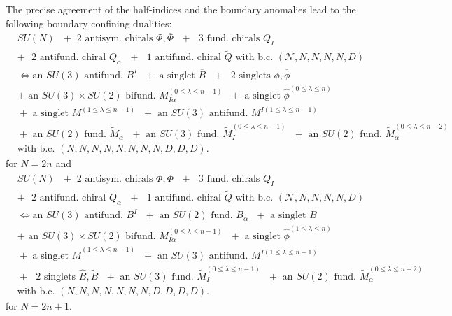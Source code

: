 \documentclass[12pt]{article}
\numberwithin{equation}{section}
\begin{document}
The precise agreement of the half-indices and the boundary anomalies lead to the following boundary confining dualities: 
\begin{align}
\label{bdy_SUN_2AS_3_3_dual1}
&\textrm{$SU(N)$ $+$ 2 antisym. chirals $\Phi, \overline{\Phi}$ $+$ $3$ fund. chirals $Q_{I}$}
\nonumber\\
&\textrm{$+$ $2$ antifund. chiral $\overline{Q}_{\alpha}$ $+$ $1$ antifund. chiral $\widetilde{Q}$ with b.c. $(\mathcal{N},N,N,N,N,D)$}
\nonumber\\
&\Leftrightarrow 
\textrm{
an $SU(3)$ antifund. $B^{I}$ $+$ a singlet $\overline{B}$ $+$ $2$ singlets $\phi, \overline{\phi}$}
\nonumber\\
&\textrm{$+$ an $SU(3)\times SU(2)$ bifund. $M_{I\alpha}^{(0\le \lambda\le n-1)}$ $+$ a singlet $\widehat{\phi}^{(0\le \lambda\le n)}$ }
\nonumber\\
&\textrm{
$+$ a singlet $M^{(1\le \lambda\le n-1)}$ $+$ an $SU(3)$ antifund. $M^{I (1\le \lambda\le n-1)}$}
\nonumber\\
&\textrm{
$+$ an $SU(2)$ fund. $\widetilde{M}_{\alpha}$ $+$ an $SU(3)$ fund. $\widetilde{M}_I^{(0\le \lambda\le n-1)}$ 
$+$ an $SU(2)$ fund. $\widetilde{M}_{\alpha}^{(0\le \lambda\le n-2)}$ 
}
\nonumber\\
&
\textrm{with b.c. $(N,N,N,N,N,N,N,N,D,D,D)$}. 
\end{align}
for $N=2n$ and
%
\begin{align}
\label{bdy_SUN_2AS_3_3_dual2}
&\textrm{$SU(N)$ $+$ 2 antisym. chirals $\Phi, \overline{\Phi}$ $+$ $3$ fund. chirals $Q_{I}$}
\nonumber\\
&\textrm{$+$ $2$ antifund. chiral $\overline{Q}_{\alpha}$ $+$ $1$ antifund. chiral $\widetilde{Q}$ with b.c. $(\mathcal{N},N,N,N,N,D)$}
\nonumber\\
&\Leftrightarrow 
\textrm{
an $SU(3)$ antifund. $B^{I}$ $+$ an $SU(2)$ fund. $\overline{B}_{\alpha}$ $+$ a singlet $B$ }
\nonumber\\
&\textrm{$+$ an $SU(3)\times SU(2)$ bifund. $M_{I\alpha}^{(0\le \lambda\le n-1)}$ $+$ a singlet $\widehat{\phi}^{(1\le \lambda\le n)}$ }
\nonumber\\
&\textrm{
$+$ a singlet $\overline{M}^{(1\le \lambda\le n-1)}$ $+$ an $SU(3)$ antifund. $M^{I (1\le \lambda\le n-1)}$}
\nonumber\\
&\textrm{
$+$ $2$ singlets $\widehat{B}, \widetilde{B}$ 
$+$ an $SU(3)$ fund. $\widetilde{M}_I^{(0\le \lambda\le n-1)}$ 
$+$ an $SU(2)$ fund. $\widetilde{M}_{\alpha}^{(0\le \lambda\le n-2)}$ 
}
\nonumber\\
&
\textrm{with b.c. $(N,N,N,N,N,N,N,D,D,D,D)$}. 
\end{align}
for $N=2n+1$. 
\end{document}
